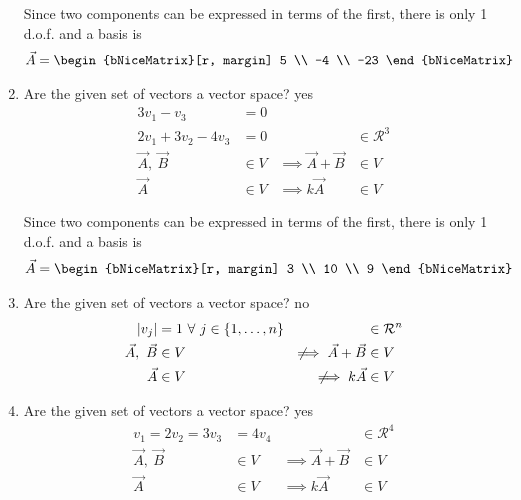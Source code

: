 \begin{enumerate}
Since two components can be expressed in terms of the first, there is only
1 d.o.f. and a basis is
\begin{align}
\vec{A} & = \begin{bNiceMatrix}[r, margin]
5 \\ -4 \\ -23
\end{bNiceMatrix}
\end{align}

\item Are the given set of vectors a vector space? \textcolor{y_h}{yes}
\begin{align}
    3v_1 - v_3                 & = 0                 \\
    2v_1 + 3v_2 - 4v_3         & = 0               &
                               & \in \mathcal{R}^3   \\
    \vec{A},\ \vec{B}          & \in V             &
    \implies \vec{A} + \vec{B} & \in V               \\
    \vec{A}                    & \in V             &
    \implies k\vec{A}          & \in V
\end{align}

Since two components can be expressed in terms of the first, there is only
1 d.o.f. and a basis is
\begin{align}
\vec{A} & = \begin{bNiceMatrix}[r, margin]
3 \\ 10 \\ 9
\end{bNiceMatrix}
\end{align}

\item Are the given set of vectors a vector space? \textcolor{y_p}{no}
\begin{align}
    |v_j|                              & = 1\ \forall\ j \in \{1,\dots,n\} &
                                       & \in \mathcal{R}^n                   \\
    \vec{A},\ \vec{B}                  & \in V                             &
    \not\!\!\implies \vec{A} + \vec{B} & \in V                               \\
    \vec{A}                            & \in V                             &
    \not\!\!\implies k\vec{A}          & \in V
\end{align}

\item Are the given set of vectors a vector space? \textcolor{y_h}{yes}
\begin{align}
    v_1 = 2v_2 = 3v_3          & = 4v_4            &
                               & \in \mathcal{R}^4   \\
    \vec{A},\ \vec{B}          & \in V             &
    \implies \vec{A} + \vec{B} & \in V               \\
    \vec{A}                    & \in V             &
    \implies k\vec{A}          & \in V
\end{align}


\end{enumerate}
